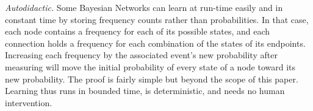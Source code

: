 \documentclass[conference]{IEEEtran}
\begin{document}
	\emph{Autodidactic.} Some Bayesian Networks can learn at run-time easily and in constant time by storing frequency counts rather than probabilities. In that case, each node contains a frequency for each of its possible states,
and each connection holds a frequency for each combination of the states of its endpoints.
Increasing each frequency
by the associated event's new probability after measuring
will move the initial probability of every state of a node toward its new probability. The proof is fairly simple but beyond the scope of this paper. Learning thus runs in bounded time, is deterministic, and needs no human intervention.

%

\end{document}
